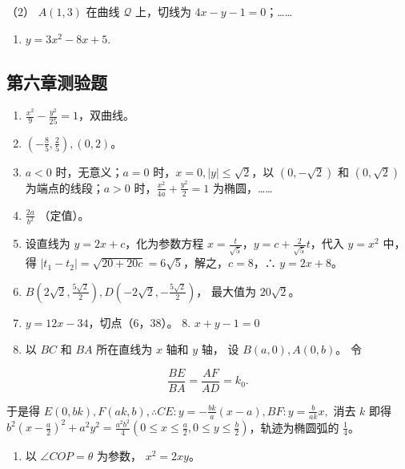 （2） \(A(1,3)\) 在曲线 \(\mathcal{Q}\) 上，切线为
\(4x - y - 1 = 0\)；\ldots\ldots{}

\begin{enumerate}
\def\labelenumi{\arabic{enumi}.}
\setcounter{enumi}{11}
\tightlist
\item
  \(y = 3x^{2} - 8x + 5.\)
\end{enumerate}

\subsection{第六章测验题}\label{ux7b2cux516dux7ae0ux6d4bux9a8cux9898-1}

\begin{enumerate}
\def\labelenumi{\arabic{enumi}.}
\item
  \(\frac{x^2}{9} - \frac{y^2}{25} = 1\)，双曲线。
\item
  \(\left(-\frac{8}{5}, \frac{2}{5}\right), (0, 2)\)。
\item
  \(a < 0\) 时，无意义；\(a = 0\)
  时，\(x = 0, |y| \leqslant \sqrt{2}\)，以 \((0, -\sqrt{2})\) 和
  \((0, \sqrt{2})\) 为端点的线段；\(a > 0\)
  时，\(\frac{x^2}{4a} + \frac{y^2}{2} = 1\) 为椭圆，\ldots\ldots{}
\item
  \(\frac{2a}{b^2}\) （定值）。
\item
  设直线为 \(y = 2x + c\)，化为参数方程
  \(x = \frac{t}{\sqrt{5}}\)，\(y = c + \frac{2}{\sqrt{5}}t\)，代入
  \(y = x^2\) 中，得
  \(|t_1 - t_2| = \sqrt{20 + 20c} = 6\sqrt{5}\)，解之，\(c = 8\)，∴
  \(y = 2x + 8\)。
\item
  \(B\left(2\sqrt{2}, \frac{5\sqrt{2}}{2}\right), D\left(-2\sqrt{2}, -\frac{5\sqrt{2}}{2}\right)\)，
  最大值为 \(20\sqrt{2}\)。
\item
  \(y = 12x - 34\)，切点（6，38）。 8. \(x + y - 1 = 0\)
\item
  以 \(BC\) 和 \(BA\) 所在直线为 \(x\) 轴和 \(y\) 轴， 设
  \(B(a,0), A(0,b)\)。 令
\end{enumerate}

\[
\frac {BE}{BA} = \frac {AF}{AD} = k_{0}.
\]

于是得
\(E(0, bk), F(ak, b), \therefore CE: y = -\frac{bk}{a} (x - a), BF: y = \frac{b}{ak} x,\)
消去 \(k\) 即得
\(b^2 \left(x - \frac{a}{2}\right)^2 + a^2 y^2 = \frac{a^2 b^2}{4} \left(0 \leqslant x \leqslant \frac{a}{2}, 0 \leqslant y \leqslant \frac{b}{2}\right)\)，轨迹为椭圆弧的
\(\frac{1}{4}\)。

\begin{enumerate}
\def\labelenumi{\arabic{enumi}.}
\setcounter{enumi}{9}
\tightlist
\item
  以 \(\angle COP = \theta\) 为参数， \(x^{2} = 2xy\)。
\end{enumerate}

